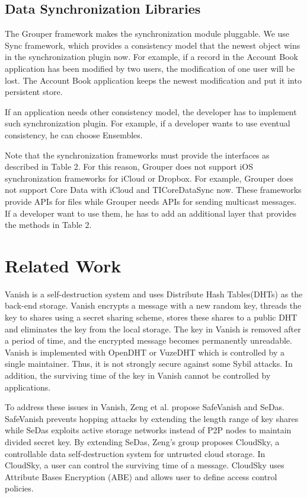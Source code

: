 \subsection{Data Synchronization Libraries}

The Grouper framework makes the synchronization module pluggable.
We use Sync\cite{sync} framework, which provides a consistency model that the newest object wins in the synchronization plugin now.
For example, if a record in the Account Book application has been modified by two users, the modification of one user will be lost.
The Account Book application keeps the newest modification and put it into persistent store.

If an application needs other consistency model, the developer has to implement such synchronization plugin.
For example, if a developer wants to use eventual consistency, he can choose Ensembles\cite{ensembles}.

Note that the synchronization frameworks must provide the interfaces as described in Table 2.
For this reason, Grouper does not support iOS synchronization frameworks for iCloud or Dropbox.
For example, Grouper does not support Core Data with iCloud\cite{coredata} and TICoreDataSync\cite{ticoredatasyn} now.
These frameworks provide APIs for files while Grouper needs APIs for sending multicast messages.
If a developer want to use them, he has to add an additional layer that provides the methods in Table 2.

\section{Related Work}

Vanish is a self-destruction system\cite{geambasu2009vanish} and uses Distribute Hash Tables(DHTs) as the back-end storage.
Vanish encrypts a message with a new random key, threads the key to shares using a secret sharing scheme, stores these shares to a public DHT and eliminates the key from the local storage.
The key in Vanish is removed after a period of time, and the encrypted message becomes permanently unreadable.
Vanish is implemented with OpenDHT\cite{rhea2005opendht} or VuzeDHT\cite{vuzedht} which is controlled by a single maintainer. 
Thus, it is not strongly secure against some Sybil attacks\cite{wolchok2010defeating}. 
In addition, the surviving time of the key in Vanish cannot be controlled by applications. 

To address these issues in Vanish, Zeng et al. propose SafeVanish\cite{zeng2010safevanish} and SeDas\cite{zeng2012sedas}. 
SafeVanish prevents hopping attacks by extending the length range of key shares while SeDas exploits active storage networks instead of P2P nodes to maintain divided secret key. By extending SeDas, Zeng's group proposes CloudSky\cite{zeng2015cloudsky}, a controllable data self-destruction system for untrusted cloud storage. 
In CloudSky, a user can control the surviving time of a message.
CloudSky uses Attribute Bases Encryption (ABE) and allows user to define access control policies.

